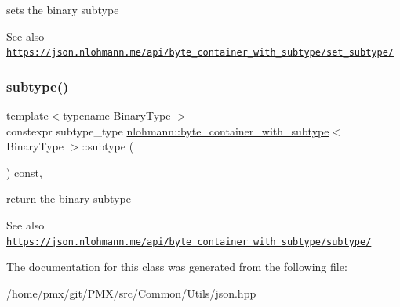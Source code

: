 sets the binary subtype 

\begin{DoxySeeAlso}{See also}
\href{https://json.nlohmann.me/api/byte_container_with_subtype/set_subtype/}{\tt https\+://json.\+nlohmann.\+me/api/byte\+\_\+container\+\_\+with\+\_\+subtype/set\+\_\+subtype/} 
\end{DoxySeeAlso}
\mbox{\label{classnlohmann_1_1byte__container__with__subtype_abe68a969df28c8cb0b63355b4d38ec1a}} 
\subsubsection{\texorpdfstring{subtype()}{subtype()}}
{\footnotesize\ttfamily template$<$typename Binary\+Type $>$ \\
constexpr subtype\+\_\+type \hyperlink{classnlohmann_1_1byte__container__with__subtype}{nlohmann\+::byte\+\_\+container\+\_\+with\+\_\+subtype}$<$ Binary\+Type $>$\+::subtype (\begin{DoxyParamCaption}{ }\end{DoxyParamCaption}) const\hspace{0.3cm}{\ttfamily [inline]}, {\ttfamily [noexcept]}}



return the binary subtype 

\begin{DoxySeeAlso}{See also}
\href{https://json.nlohmann.me/api/byte_container_with_subtype/subtype/}{\tt https\+://json.\+nlohmann.\+me/api/byte\+\_\+container\+\_\+with\+\_\+subtype/subtype/} 
\end{DoxySeeAlso}


The documentation for this class was generated from the following file\+:\begin{DoxyCompactItemize}
\item 
/home/pmx/git/\+P\+M\+X/src/\+Common/\+Utils/json.\+hpp\end{DoxyCompactItemize}
